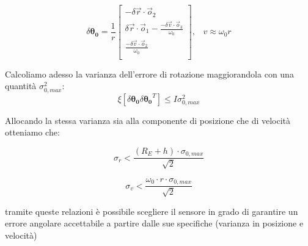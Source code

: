 \begin{equation}
	\delta \boldsymbol{\theta_0}= \frac{1}{r}
	\begin{bmatrix}
	-\delta\vec{r}\cdot\vec{o}_2\\
	\delta\vec{r}\cdot\vec{o}_1-\frac{-\delta\vec{v}\cdot\vec{o}_3}{\omega_0}\\
	\frac{-\delta\vec{v}\cdot\vec{o}_2}{\omega_0}\\
	\end{bmatrix}
,\hspace{10pt} v\approx\omega_0 r 
\end{equation}

Calcoliamo adesso la varianza dell'errore di rotazione maggiorandola con una
quantità $\sigma^2_{0,max}$:
\begin{equation}
\xi[\delta\boldsymbol{\theta_0}
\delta\boldsymbol{\theta_0}^T]\le I \sigma^2_{0,max}
\end{equation}

Allocando la stessa varianza sia alla componente di posizione che di velocità
otteniamo che:

\begin{equation}
\sigma_r < \frac{(R_E + h)\cdot\sigma_{0,max}}{\sqrt{2}}
\end{equation}

\begin{equation}
\sigma_v < \frac{\omega_0\cdot r\cdot \sigma_{0,max}}{\sqrt{2}}
\end{equation}

tramite queste relazioni è possibile scegliere il sensore in grado di garantire
un errore angolare accettabile a partire dalle sue specifiche (varianza in
posizione e velocità)
